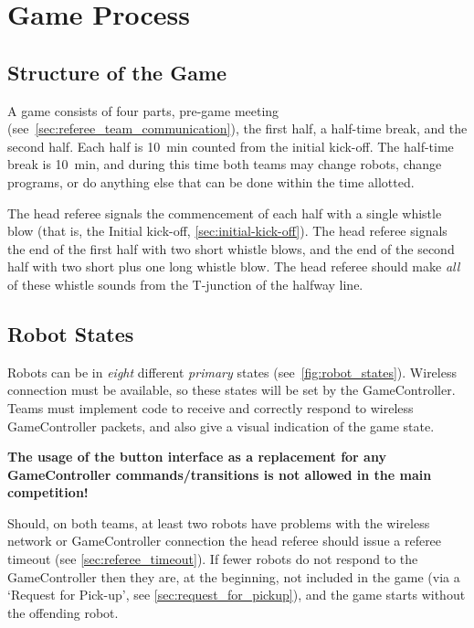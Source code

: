 \section{Game Process}
\label{sec:game_process}

\subsection{Structure of the Game}
\label{sec:game_struct}

A game consists of four parts, pre-game meeting (see~\cref{sec:referee_team_communication}), the first half, a half-time break, and the second half.
Each half is \qty{10}{\minute} counted from the initial kick-off.
The half-time break is \qty{10}{\minute}, and during this time both teams may change robots, change programs, or do anything else that can be done within the time allotted.

The head referee signals the commencement of each half with a single whistle blow (that is, the Initial kick-off, \cf \cref{sec:initial-kick-off}).
The head referee signals the end of the first half with two short whistle blows, and the end of the second half with two short plus one long whistle blow.
The head referee should make \textit{all} of these whistle sounds from the T-junction of the halfway line.

\subsection{Robot States}
\label{sec:robot_states}

Robots can be in \textit{eight} different \emph{primary} states (see~\cref{fig:robot_states}).
Wireless connection must be available, so these states will be set by the GameController.
Teams must implement code to receive and correctly respond to wireless GameController packets, and also give a visual indication of the game state.

\textbf{The usage of the button interface as a replacement for any GameController commands/transitions is not allowed in the main competition!}

Should, on both teams, at least two robots have problems with the wireless network or GameController connection the head referee should issue a referee timeout (see \cref{sec:referee_timeout}).
If fewer robots do not respond to the GameController then they are, at the beginning, not included in the game (via a `Request for Pick-up', see \cref{sec:request_for_pickup}), and the game starts without the offending robot.

